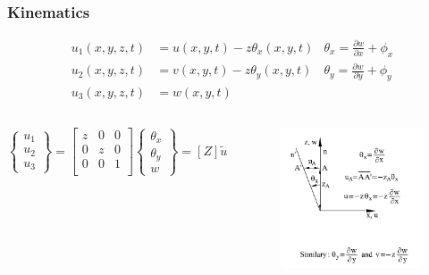 \documentclass[9pt]{beamer}
\begin{document}
\begin{frame}
\frametitle{Kinematics}
\begin{align*}
u_1 \left( x, y ,z,t\right) & =  u \left( x ,y,t\right) - z \theta_x \left(x,y,t\right) & \theta_x  = \frac{\partial w }{\partial x} + \phi_x \\
u_2 \left( x, y ,z,t\right) & =  v \left( x, y ,t\right) - z \theta_y \left(x,y,t\right)& \theta_y  = \frac{\partial w }{\partial y} + \phi_y\\
u_3 \left( x, y ,z,t\right) & =  w \left(x, y ,t\right) 
\end{align*}
\begin{columns}
\begin{equation*}
\left\{
\begin{array}{r}
 u_1 \\ u_2 \\ u_3  
\end{array}
\right\}
=
\begin{bmatrix}
z & 0 & 0 \\
0 & z & 0 \\
0 & 0 & 1 \\
\end{bmatrix}
\left\{
\begin{array}{r}
 \theta_x \\ \theta_y \\ w 
\end{array}
\right\}
=
\left[Z \right] \tilde{u}
\end{equation*}
\begin{figure}[h!]
  \includegraphics[width=1\linewidth,trim={0 2cm 0 0},clip]{displacement.png}
\end{figure}
\end{columns}

\end{frame}
\end{document}
